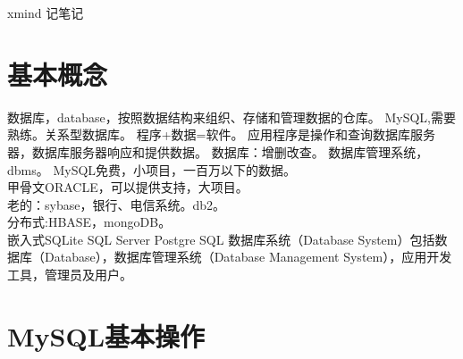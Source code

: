 \documentclass[UTF8]{article}
\begin{document}
xmind 记笔记

\section{基本概念}
数据库，database，按照数据结构来组织、存储和管理数据的仓库。
MySQL,需要熟练。关系型数据库。
程序+数据=软件。
应用程序是操作和查询数据库服务器，数据库服务器响应和提供数据。
数据库：增删改查。
数据库管理系统，dbms。
MySQL免费，小项目，一百万以下的数据。\\
甲骨文ORACLE，可以提供支持，大项目。\\
老的：sybase，银行、电信系统。db2。\\
分布式:HBASE，mongoDB。\\
嵌入式SQLite
SQL Server
Postgre SQL
数据库系统（Database System）包括数据库（Database），数据库管理系统（Database Management System），应用开发工具，管理员及用户。

\section{MySQL基本操作}
\end{document}
